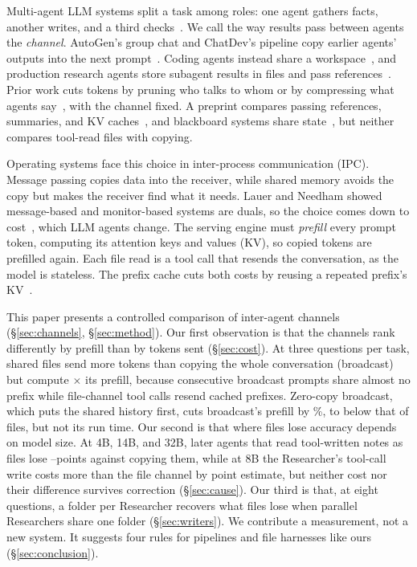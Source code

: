 \documentclass[sigplan,10pt,nonacm,review,anonymous]{acmart}
\begin{document}
Multi-agent LLM systems split a task among roles: one agent gathers facts, another writes, and a
third checks~\cite{autogen,metagpt,chatdev}. We call the way results pass between agents the
\emph{channel}. AutoGen's group chat and ChatDev's pipeline copy earlier agents' outputs into the next
prompt~\cite{autogen,chatdev}. Coding agents instead share a workspace~\cite{sweagent,openhands}, and
production research agents store subagent results in files and pass
references~\cite{anthropic-multiagent}. Prior work cuts tokens by pruning who talks to whom or by compressing what
agents say~\cite{agentprune,optima,pact}, with the channel fixed. A preprint compares passing references,
summaries, and KV caches~\cite{toap}, and blackboard systems share
state~\cite{lbmas,blackboard-ds}, but neither compares tool-read files with copying.

Operating systems face this choice in inter-process communication (IPC). Message passing copies data into
the receiver, while shared memory avoids the copy but makes the receiver find what it needs. Lauer and Needham
showed message-based and monitor-based systems are duals, so the choice comes down to cost~\cite{lauer-needham}, which LLM
agents change. The serving engine must \emph{prefill} every prompt token, computing its attention keys
and values (KV), so copied tokens are prefilled again. Each file read is a tool call that resends the
conversation, as the model is stateless. The prefix cache cuts both costs by reusing a repeated prefix's
KV~\cite{vllm,sglang}.

This paper presents a controlled comparison of inter-agent channels (\S\ref{sec:channels},
\S\ref{sec:method}). Our first observation is that the channels rank differently by prefill than by tokens
sent (\S\ref{sec:cost}). At three questions per task, shared files send more tokens than copying the whole conversation
(broadcast) but compute \nCompRatioB{}$\times$ its prefill, because consecutive broadcast prompts share
almost no prefix while file-channel tool calls resend cached prefixes. Zero-copy broadcast, which puts the
shared history first, cuts broadcast's prefill by \nZcCut{}\%, to below that of files, but not its run time.
Our second is that where files lose accuracy depends on model size. At 4B, 14B, and 32B, later agents that
read tool-written notes as files lose \nRTenHolmFileToolAbsMin--\nRTenHolmFileToolAbsMax points against
copying them, while at 8B the Researcher's tool-call write costs more than the file channel by point estimate, but neither
cost nor their difference survives correction (\S\ref{sec:cause}). Our third is that, at eight
questions, a folder per Researcher recovers what files lose when parallel Researchers share one folder
(\S\ref{sec:writers}). We contribute a measurement, not a new system. It suggests four
rules for pipelines and file harnesses like ours (\S\ref{sec:conclusion}).
\end{document}
